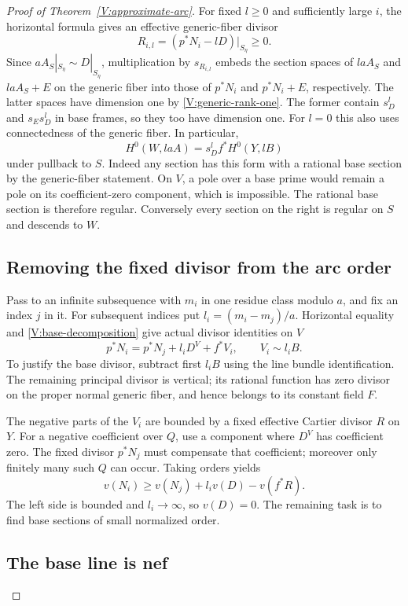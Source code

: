\begin{proof}[Proof of Theorem~\ref{V:approximate-arc}]
For fixed $l\ge0$ and sufficiently large $i$, the horizontal formula
gives an effective generic-fiber divisor
\[
 R_{i,l}=(p^*N_i-lD)|_{S_\eta}\ge0.
\]
Since $aA_S|_{S_\eta}\sim D|_{S_\eta}$, multiplication by
$s_{R_{i,l}}$ embeds the section spaces of $laA_S$ and $laA_S+E$
on the generic fiber into those of $p^*N_i$ and $p^*N_i+E$,
respectively.  The latter spaces have dimension one by
\eqref{V:generic-rank-one}.  The former contain $s_D^l$ and
$s_Es_D^l$ in base frames, so they too have dimension one.  For $l=0$
this also uses connectedness of the generic fiber.
In particular,
\begin{equation}\label{V:global-sections-base}
 H^0(W,laA)=s_D^l f^*H^0(Y,lB)
\end{equation}
under pullback to $S$.  Indeed any section has this form with a
rational base section by the generic-fiber statement.  On $V$, a pole
over a base prime would remain a pole on its coefficient-zero
component, which is impossible.  The rational base section is therefore
regular.  Conversely every section on the right is regular on $S$ and
descends to $W$.

\subsection*{Removing the fixed divisor from the arc order}

Pass to an infinite subsequence with $m_i$ in one residue class modulo
$a$, and fix an index $j$ in it.  For subsequent indices put
$l_i=(m_i-m_j)/a$.  Horizontal equality and
\eqref{V:base-decomposition} give actual divisor identities on $V$
\[
 p^*N_i=p^*N_j+l_iD^V+f^*V_i,
 \qquad V_i\sim l_iB.
\]
To justify the base divisor, subtract first $l_iB$ using the line
bundle identification.  The remaining principal divisor is vertical;
its rational function has zero divisor on the proper normal generic
fiber, and hence belongs to its constant field $F$.

The negative parts of the $V_i$ are bounded by a fixed effective
Cartier divisor $R$ on $Y$.  For a negative coefficient over $Q$, use
a component where $D^V$ has coefficient zero.  The fixed divisor
$p^*N_j$ must compensate that coefficient; moreover only finitely many
such $Q$ can occur.  Taking orders yields
\[
 v(N_i)\ge v(N_j)+l_i v(D)-v(f^*R).
\]
The left side is bounded and $l_i\to\infty$, so $v(D)=0$.
The remaining task is to find base sections of small normalized order.

\subsection*{The base line is nef}


\end{proof}
